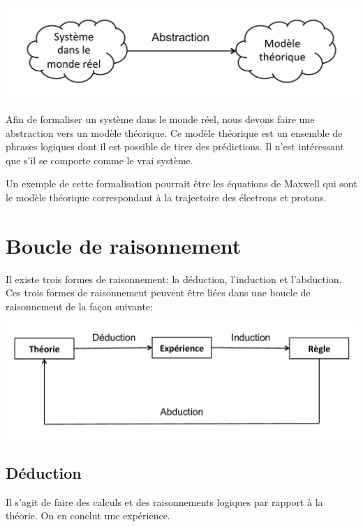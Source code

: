 \begin{center}
\includegraphics[scale=0.65]{images/Abstraction.pdf}
\end{center}

Afin de formaliser un système dans le monde réel, nous devons faire une abstraction vers un modèle théorique. Ce modèle théorique est un ensemble de phrases logiques dont il est possible de tirer des prédictions. Il n'est intéressant que s'il se comporte comme le vrai système.

Un exemple de cette formalisation pourrait être les équations de Maxwell qui sont le modèle théorique correspondant à la trajectoire des électrons et protons.

\section{Boucle de raisonnement}

Il existe trois formes de raisonnement: la déduction, l'induction et l'abduction. Ces trois formes de raisonnement peuvent être liées dans une boucle de raisonnement de la façon suivante:

\begin{center}
\includegraphics[scale=0.50]{images/BoucleRaisonnement1.pdf}
\end{center}

\subsection{Déduction}

Il s'agit de faire des calculs et des raisonnements logiques par rapport à la théorie. On en conclut une expérience. \\

